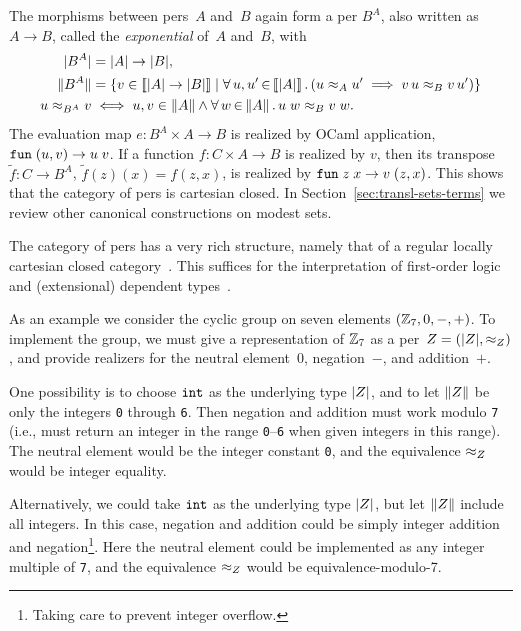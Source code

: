 The morphisms between pers~$A$ and~$B$ again form a per
$B^A$, also written as $A \to B$, called the \emph{exponential} of~$A$
and~$B$, with
%
\begin{align*}
  |B^A| &= |A| \to |B|,\\
  \|B^A\| &=
  \{v \in [\![|A| \to |B|]\!] \mid 
    \forall\, u,u' \,{\in}\, [\![|A|]\!]\,.\left(u \approx_A u' \implies v\,u \approx_B v\,u'\right)\}
  \\
  u \approx_{B^A} v &\iff u, v \in \|A\| \land
  \forall\, w \,{\in}\, \|A\|\,.\,u\;w \approx_B v\;w.
\end{align*}
%
The evaluation map $e : B^A \times A \to B$ is realized by OCaml
application, $\mathtt{fun}\;(u,v) \to u\;v$. If a function $f : C \times A \to
B$ is realized by $v$, then its transpose $\tilde{f} : C \to B^A$,
$\tilde{f}(z)(x) = f(z,x)$, is realized by $\mathtt{fun}\;z\;x \to v \; (z,x)$.
This shows that the category of pers is cartesian closed. In
Section~\ref{sec:transl-sets-terms} we review other canonical
constructions on modest sets.

\bigskip
\else %
%
The category of pers has a very rich structure, namely that of a
regular locally cartesian closed category~\cite{Bauer:00}. This
suffices for the interpretation of first-order logic and (extensional)
dependent types~\cite{JacobsB:cltt}.
%
\fi %

\iflong
%
As an example we consider the cyclic group on seven elements $(\mathbb{Z}_7,
0, {-}, {+})$. To implement the group, we must give a representation
of $\mathbb{Z}_7$ as a per~$Z = (|Z|, {\approx_Z})$, and
provide realizers for the neutral element~$0$, negation~$-$, and
addition~$+$. 

One possibility is to choose $\mathtt{int}$ as the underlying type
$|Z|$, and to let $\|Z\|$ be only the integers \texttt{0}
through \texttt{6}. Then negation and addition must work modulo
\texttt{7} (i.e., must return an integer in the range
\texttt{0}--\texttt{6} when given integers in this range). The neutral
element would be the integer constant \texttt{0}, and the equivalence
$\approx_Z$ would be integer equality.

Alternatively, we could take $\mathtt{int}$ as the underlying type
$|Z|$, but let $\|Z\|$ include all integers. In this
case, negation and addition could be simply integer addition and
negation\footnote{Taking care to prevent integer
  overflow.}. Here the neutral element could be implemented as any
integer multiple of \texttt{7}, and the equivalence $\approx_Z$ would be
equivalence-modulo-7.

